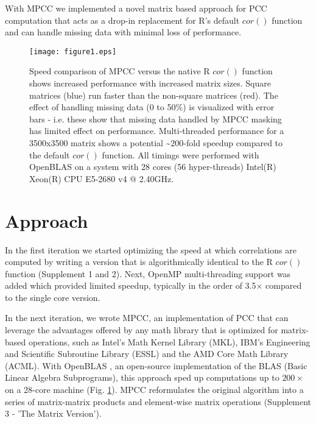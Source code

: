\documentclass{bioinfo}
\begin{document}
With MPCC we implemented a novel matrix based approach for PCC
computation that acts as a drop-in replacement for R's default $cor()$
function and can handle missing data with minimal loss of performance.
\vspace*{-4mm}

\begin{figure}[H]
\centering
\texttt{[image: figure1.eps]}
  \vspace{-8mm} \caption{ \small Speed comparison of MPCC versus the
  native R $cor()$ function shows increased performance with increased
  matrix sizes. Square matrices (blue) run faster than the non-square
  matrices (red).  The effect of handling missing data (0 to 50\%) is
  visualized with error bars - i.e. these show that missing data
  handled by MPCC masking has limited effect on performance.
  Multi-threaded performance for a 3500x3500 matrix shows a
  potential \textasciitilde{}$200$-fold speedup compared to the
  default $cor()$ function.  All timings were performed with OpenBLAS
  on a system with 28 cores (56 hyper-threads) Intel(R) Xeon(R) CPU
  E5-2680 v4 @ 2.40GHz.  } \label{fig:fig1}
\end{figure}

\vspace*{-12mm}

\section{Approach}

In the first iteration we started optimizing the speed at which
correlations are computed by writing a version that is algorithmically
identical to the R $cor()$ function (Supplement 1 and 2). Next, OpenMP
multi-threading support was added which provided limited speedup,
typically in the order of 3.5$\times$ compared to the single core
version.

In the next iteration, we wrote MPCC, an implementation of PCC that
can leverage the advantages offered by any math library that is
optimized for matrix-based operations, such as Intel's Math Kernel
Library (MKL), IBM's Engineering and Scientific Subroutine Library
(ESSL) and the AMD Core Math Library (ACML). With OpenBLAS \citep{Zhang:2011}, an 
open-source implementation of the BLAS (Basic Linear Algebra 
Subprograms), this approach sped up computations up to $200\times$ 
on a 28-core machine (Fig. \ref{fig:fig1}). MPCC reformulates the 
original algorithm into a series of matrix-matrix products and 
element-wise matrix operations (Supplement 3 - 'The Matrix Version').
\end{document}
